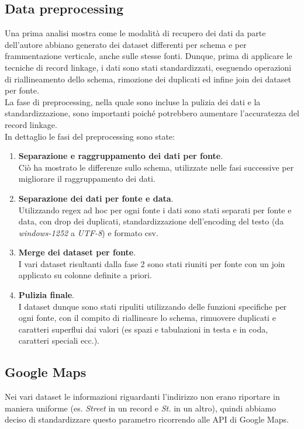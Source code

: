 \documentclass[a4paper,12pt]{article}
\begin{document}
\subsection{Data preprocessing} 
Una prima analisi mostra come le modalità di recupero dei dati da parte dell'autore abbiano generato dei dataset differenti per schema e per frammentazione verticale, anche sulle stesse fonti. Dunque, prima di applicare le tecniche di record linkage, i dati sono stati standardizzati, eseguendo operazioni di riallineamento dello schema, rimozione dei duplicati ed infine join dei dataset per fonte.\\
\noindent La fase di preprocessing, nella quale sono incluse la pulizia dei dati e la standardizzazione, sono importanti poiché potrebbero aumentare l'accuratezza del record linkage.\\
In dettaglio le fasi del preprocessing sono state: 
\begin{enumerate}
	\item \textbf{Separazione e raggruppamento dei dati per fonte}.\\Ciò ha mostrato le differenze sullo schema, utilizzate nelle fasi successive per migliorare il raggruppamento dei dati.
	\item \textbf{Separazione dei dati per fonte e data}.\\Utilizzando regex ad hoc per ogni fonte i dati sono stati separati per fonte e data, con drop dei duplicati, standardizzazione dell'encoding del testo (da \textit{windows-1252} a \textit{UTF-8}) e formato csv.
	\item \textbf{Merge dei dataset per fonte}.\\I vari dataset risultanti dalla fase 2 sono stati riuniti per fonte con un join applicato su colonne definite a priori. 
	\item \textbf{Pulizia finale}.\\I dataset dunque sono stati ripuliti utilizzando delle funzioni specifiche per ogni fonte, con il compito di riallineare lo schema, rimuovere duplicati e caratteri superflui dai valori (es spazi e tabulazioni in testa e in coda, caratteri speciali ecc.).  
\end{enumerate}

\subsection{Google Maps}
Nei vari dataset le informazioni riguardanti l'indirizzo non erano riportare in maniera uniforme (es. \textit{Street} in un record e \textit{St.} in un altro), quindi abbiamo deciso di standardizzare questo parametro ricorrendo alle API di Google Maps.
\end{document}
